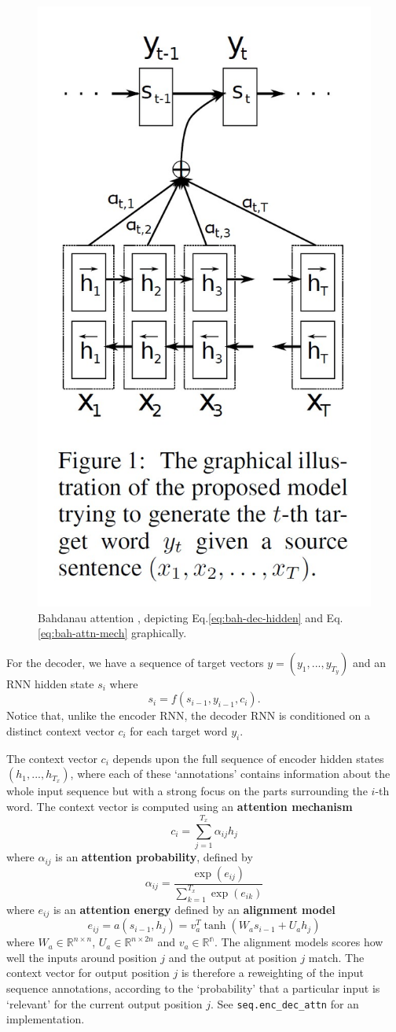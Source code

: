 \documentclass[11pt]{article}
\numberwithin{equation}{section}
\begin{document}
\begin{figure}
\begin{center}
\includegraphics[width=0.4\columnwidth]{../figures/enc-dec-attn.jpg}  
\end{center}
\caption{Bahdanau attention \citep{bahdanau14}, depicting Eq.\eqref{eq:bah-dec-hidden} and Eq.\eqref{eq:bah-attn-mech} graphically.}
\label{fig:bah-attn}
\end{figure}

For the decoder, we have a sequence of target vectors $y=(y_1,...,y_{T_y})$ and an RNN hidden state $s_i$ where
\begin{equation}
s_i = f(s_{i-1}, y_{i-1}, c_i). \label{eq:bah-dec-hidden}
\end{equation}
Notice that, unlike the encoder RNN, the decoder RNN is conditioned on a distinct context vector $c_i$ for each target word $y_i$.

The context vector $c_i$ depends upon the full sequence of encoder hidden states $(h_1, ..., h_{T_x})$, where each of these `annotations' contains information about the whole input sequence but with a strong focus on the parts surrounding the $i$-th word. The context vector is computed using an \textbf{attention mechanism}
\begin{equation}
c_i = \sum_{j=1}^{T_x} \alpha_{ij} h_j \label{eq:bah-attn-mech}
\end{equation}
where $\alpha_{ij}$ is an \textbf{attention probability}, defined by
\begin{equation}
\alpha_{ij} = \frac{\exp(e_{ij})}{\sum_{k=1}^{T_x}\exp(e_{ik})}
\end{equation}
where $e_{ij}$ is an \textbf{attention energy} defined by an \textbf{alignment model}
\begin{equation}
e_{ij} = a(s_{i-1}, h_j) = v_a^T \tanh(W_a s_{i-1} + U_a h_j)
\end{equation}
where $W_a \in \mathbb{R}^{n \times n}$, $U_a \in \mathbb{R}^{n \times 2n}$ and $v_a \in \mathbb{R^n}$. The alignment models scores how well the inputs around position $j$ and the output at position $j$ match. The context vector for output position $j$ is therefore a reweighting of the input sequence annotations, according to the `probability' that a particular input is `relevant' for the current output position $j$. See \verb#seq.enc_dec_attn# for an implementation.
\end{document}
